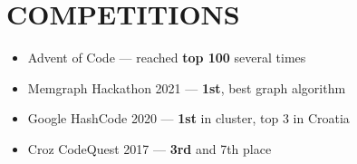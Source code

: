 \documentclass{article}
\begin{document}

\section{COMPETITIONS}
\begin{itemize}
  \itemsep0em
  \item Advent of Code --- reached {\bfseries top 100} several times
  \item Memgraph Hackathon 2021 --- {\bfseries 1st}, best graph algorithm
  \item Google HashCode 2020 --- {\bfseries 1st} in cluster, top 3 in Croatia
  \item Croz CodeQuest 2017 --- {\bfseries 3rd} and 7th place
\end{itemize}

\end{document}
